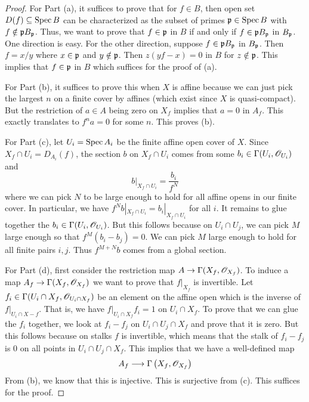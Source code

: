 \documentclass[]{pcmi}
\theoremstyle{plain}
\theoremstyle{definition}
\theoremstyle{remark}
\begin{document}
\begin{proof}
    For Part (a), it suffices to prove that for $f \in B$, then open set $D(f) \subseteq \operatorname{Spec} B$ can be characterized as the subset of primes $\mathfrak{p} \in \operatorname{Spec} B$ with $f \notin \mathfrak{p} B_{\mathfrak{p}}$. Thus, we want to prove that $f \in \mathfrak{p}$ in $B$ if and only if $f \in \mathfrak{p} B_{\mathfrak{p}}$ in $B_{\mathfrak{p}}$. One direction is easy. For the other direction, suppose $f \in \mathfrak{p} B_{\mathfrak{p}}$ in $B_{\mathfrak{p}}$. Then $f = x/y$ where $x \in \mathfrak{p}$ and $y \notin \mathfrak{p}$. Then $z(yf - x) = 0$ in $B$ for $z \notin \mathfrak{p}$. This implies that $f \in \mathfrak{p}$ in $B$ which suffices for the proof of (a). 

    For Part (b), it suffices to prove this when $X$ is affine because we can just pick the largest $n$ on a finite cover by affines (which exist since $X$ is quasi-compact). But the restriction of $a \in A$ being zero on $X_f$ implies that $a = 0$ in $A_f$. This exactly translates to $f^n a = 0$ for some $n$. This proves (b). 

    For Part (c), let $U_i = \operatorname{Spec} A_i$ be the finite affine open cover of $X$. Since $X_f \cap U_i = D_{A_i}(f)$, the section $b$ on $X_f \cap U_i$ comes from some $b_i \in \Gamma(U_i, \mathscr{O}_{U_i})$ and 
    \[
        b |_{X_f \cap U_i} = \frac{b_i}{f^N}
    \]
    where we can pick $N$ to be large enough to hold for all affine opens in our finite cover. In particular, we have $f^N b |_{X_f \cap U_i} = b_i |_{X_f \cap U_i}$ for all $i$. It remains to glue together the $b_i \in \Gamma(U_i, \mathscr{O}_{U_i})$. But this follows because on $U_i \cap U_j$, we can pick $M$ large enough so that $f^M(b_i - b_j) = 0$. We can pick $M$ large enough to hold for all finite pairs $i, j$. Thus $f^{M+N} b$ comes from a global section. 

    For Part (d), first consider the restriction map $A \to \Gamma(X_f, \mathscr{O}_{X_f})$. To induce a map $A_f \to \Gamma(X_f, \mathscr{O}_{X_f})$ we want to prove that $f|_{X_f}$ is invertible. Let $f_i \in \Gamma(U_i \cap X_f, \mathscr{O}_{U_i \cap X_f})$ be an element on the affine open which is the inverse of $f|_{U_i \cap X-f}$. That is, we have $f|_{U_i \cap X_f} f_i = 1$ on $U_i \cap X_f$. To prove that we can glue the $f_i$ together, we look at $f_i - f_j$ on $U_i \cap U_j \cap X_f$ and prove that it is zero. But this follows because on stalks $f$ is invertible, which means that the stalk of $f_i - f_j$ is $0$ on all points in $U_i \cap U_j \cap X_f$. This implies that we have a well-defined map 
    \[
        A_f \longrightarrow \Gamma \left (X_f, \mathscr{O}_{X_f} \right )
    \]
    From (b), we know that this is injective. This is surjective from (c). This suffices for the proof. 
\end{proof}
\end{document}
